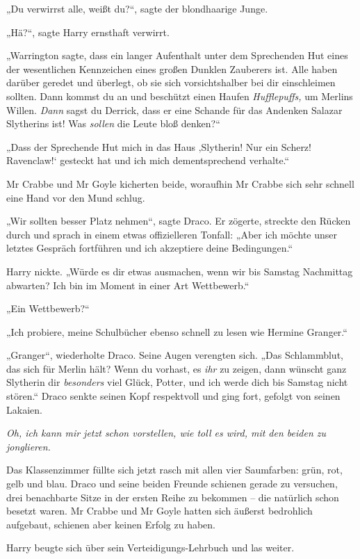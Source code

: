 {„Du verwirrst alle, weißt du?“, sagte der blondhaarige Junge.

„Hä?“, sagte Harry ernsthaft verwirrt.

„Warrington sagte, dass ein langer Aufenthalt unter dem Sprechenden Hut eines der wesentlichen Kennzeichen eines großen Dunklen Zauberers ist. Alle haben darüber geredet und überlegt, ob sie sich vorsichtshalber bei dir einschleimen sollten. Dann kommst du an und beschützt einen Haufen \emph{Hufflepuffs,} um Merlins Willen. \emph{Dann} sagst du Derrick, dass er eine Schande für das Andenken Salazar Slytherins ist! Was \emph{sollen} die Leute bloß denken?“

„Dass der Sprechende Hut mich in das Haus ‚Slytherin! Nur ein Scherz! Ravenclaw!` gesteckt hat und ich mich dementsprechend verhalte.“

Mr Crabbe und Mr Goyle kicherten beide, woraufhin Mr Crabbe sich sehr schnell eine Hand vor den Mund schlug.

„Wir sollten besser Platz nehmen“, sagte Draco. Er zögerte, streckte den Rücken durch und sprach in einem etwas offizielleren Tonfall: „Aber ich möchte unser letztes Gespräch fortführen und ich akzeptiere deine Bedingungen.“

Harry nickte. „Würde es dir etwas ausmachen, wenn wir bis Samstag Nachmittag abwarten? Ich bin im Moment in einer Art Wettbewerb.“

„Ein Wettbewerb?“

„Ich probiere, meine Schulbücher ebenso schnell zu lesen wie Hermine Granger.“

„Granger“, wiederholte Draco. Seine Augen verengten sich. „Das Schlammblut, das sich für Merlin hält? Wenn du vorhast, es \emph{ihr} zu zeigen, dann wünscht ganz Slytherin dir \emph{besonders} viel Glück, Potter, und ich werde dich bis Samstag nicht stören.“ Draco senkte seinen Kopf respektvoll und ging fort, gefolgt von seinen Lakaien.

\emph{Oh, ich kann mir jetzt schon vorstellen, wie toll es wird, mit den beiden zu jonglieren.}

Das Klassenzimmer füllte sich jetzt rasch mit allen vier Saumfarben: grün, rot, gelb und blau. Draco und seine beiden Freunde schienen gerade zu versuchen, drei benachbarte Sitze in der ersten Reihe zu bekommen -- die natürlich schon besetzt waren. Mr Crabbe und Mr Goyle hatten sich äußerst bedrohlich aufgebaut, schienen aber keinen Erfolg zu haben.

Harry beugte sich über sein Verteidigungs-Lehrbuch und las weiter.

}
